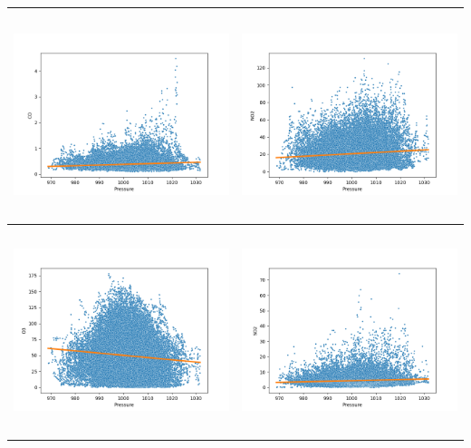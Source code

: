 \documentclass[18pt, letterpaper]{article}
\begin{document}
\begin{table}[H]
\centering
\begin{tabular}{|c|c|}
\hline
\includegraphics[width=80mm,height=60mm]{visualisations/corr_plots/PressurexCO_scatter.png}  & \includegraphics[width=80mm,height=60mm]{visualisations/corr_plots/PressurexNO2_scatter.png} \\ \hline
\includegraphics[width=80mm,height=60mm]{visualisations/corr_plots/PressurexO3_scatter.png}  & \includegraphics[width=80mm,height=60mm]{visualisations/corr_plots/PressurexSO2_scatter.png} \\ \hline

\end{tabular}
\end{table}
\end{document}
